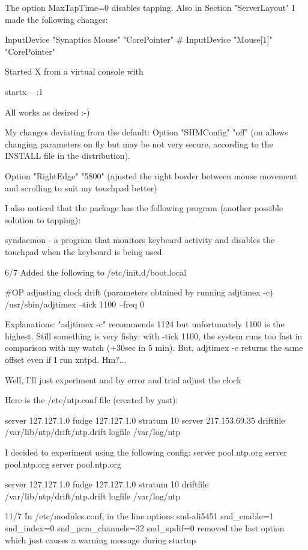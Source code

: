 The option MaxTapTime=0 disables tapping. Also in Section
"ServerLayout" I made the following changes:

  InputDevice  "Synaptics Mouse" "CorePointer"
#  InputDevice  "Mouse[1]" "CorePointer"

Started X from a virtual console with 

startx -- :1

All works as desired :-)

My changes deviating from the default: 
  Option        "SHMConfig"     "off"
(on allows changing parameters on fly but may be not very secure, according
to the INSTALL file in the distribution).

  Option        "RightEdge"     "5800"
 (ajusted the right border between mouse movement and scrolling to suit my
touchpad better)

I also noticed that the package has the following program 
(another possible solution to tapping):

syndaemon  - a program that monitors keyboard activity and
disables the touchpad when the keyboard is being used.

6/7
Added the following to /etc/init.d/boot.local 

#OP adjusting clock drift (parameters obtained by running adjtimex -c)
/usr/sbin/adjtimex --tick 1100  --freq 0

Explanations: "adjtimex -c" recommends 1124 but unfortunately 1100 is 
the highest. Still something is very fishy: with -tick 1100, the system
runs too fast in comparison with my watch (+30sec in 5 min). But, adjtimex -c
returns the same offset even if I run xntpd. Hm?... 

Well, I'll just experiment and by error and trial adjust the clock


Here is the /etc/ntp.conf file (created by yast):

server 127.127.1.0
fudge 127.127.1.0 stratum 10
server 217.153.69.35
driftfile /var/lib/ntp/drift/ntp.drift
logfile /var/log/ntp

I decided to experiment using the following config:
server pool.ntp.org                                                            
server pool.ntp.org
server pool.ntp.org 
                                                      
server 127.127.1.0 
fudge 127.127.1.0 stratum 10
driftfile /var/lib/ntp/drift/ntp.drift
logfile /var/log/ntp

11/7
In /etc/modules.conf, in the line
options snd-ali5451 snd_enable=1 snd_index=0 snd_pcm_channels=32 snd_spdif=0
removed the last option which just causes a warning message during startup


